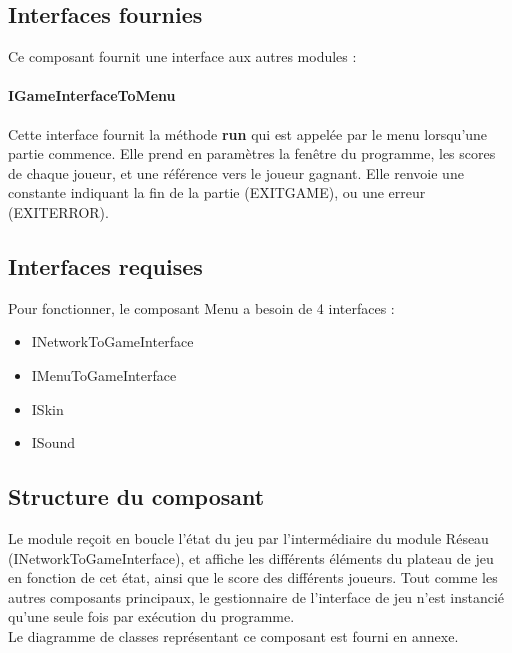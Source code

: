\subsection{Interfaces fournies}

Ce composant fournit une interface aux autres modules :

\paragraph{IGameInterfaceToMenu}

Cette interface fournit la méthode \textbf{run} qui est appelée par le menu lorsqu'une partie commence. Elle prend en paramètres la fenêtre du programme, les scores de chaque joueur, et une référence vers le joueur gagnant. Elle renvoie une constante indiquant la fin de la partie (EXITGAME), ou une erreur (EXITERROR).

\subsection{Interfaces requises}

Pour fonctionner, le composant Menu a besoin de 4 interfaces :
\begin{itemize}
    \item INetworkToGameInterface
    \item IMenuToGameInterface
    \item ISkin
    \item ISound    
\end{itemize}

\subsection{Structure du composant}

Le module reçoit en boucle l'état du jeu par l'intermédiaire du module Réseau (INetworkToGameInterface), et affiche les différents éléments du plateau de jeu en fonction de cet état, ainsi que le score des différents joueurs. Tout comme les autres composants principaux, le gestionnaire de l'interface de jeu n'est instancié qu'une seule fois par exécution du programme.\\

Le diagramme de classes représentant ce composant est fourni en annexe.
